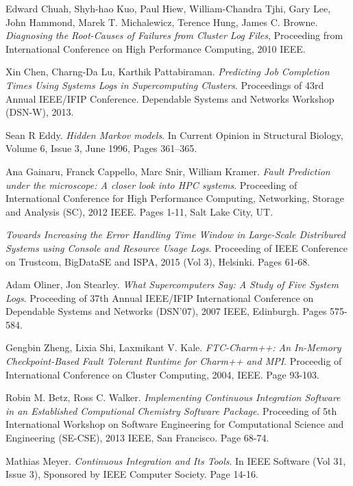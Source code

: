 \documentclass[10pt]{ruthesis}
\begin{document}
\begin{thebibliography}{30}
Edward Chuah, Shyh-hao Kuo, Paul Hiew, William-Chandra Tjhi, Gary Lee, John Hammond, Marek T. Michalewicz, Terence Hung, James C. Browne.
\textit{Diagnosing the Root-Causes of Failures from Cluster Log Files}, 
Proceeding from International Conference on High Performance Computing, 2010 IEEE.

Xin Chen, Charng-Da Lu, Karthik Pattabiraman.
\textit{Predicting Job Completion Times Using Systems Logs in Supercomputing Clusters}.
Proceedings of 43rd Annual IEEE/IFIP Conference.
Dependable Systems and Networks Workshop (DSN-W), 2013.

Sean R Eddy.
\textit{Hidden Markov models}.
In Current Opinion in Structural Biology, 
Volume 6, Issue 3, June 1996, Pages 361–365.

Ana Gainaru, Franck Cappello, Marc Snir, William Kramer.
\textit{Fault Prediction under the microscope: A closer look into HPC systems}.
Proceeding of International Conference for High Performance Computing, Networking, Storage and Analysis (SC), 2012 IEEE. Pages 1-11, Salt Lake City, UT.

\textit{Towards Increasing the Error Handling Time Window in Large-Scale Distribured Systems using Console and Resource Usage Logs}.
Proceeding of IEEE Conference on Trustcom, BigDataSE and ISPA, 2015 (Vol 3),
Helsinki. Pages 61-68.

Adam Oliner, Jon Stearley.
\textit{What Supercomputers Say: A Study of Five System Logs}.
Proceeding of 37th Annual IEEE/IFIP International Conference on Dependable Systems and Networks (DSN'07), 2007 IEEE, Edinburgh. Pages 575-584.

Gengbin Zheng, Lixia Shi, Laxmikant V. Kale.
\textit{FTC-Charm++: An In-Memory Checkpoint-Based Fault Tolerant Runtime for Charm++ and MPI}.
Proceedig of International Conference on Cluster Computing, 2004, IEEE. 
Page 93-103.

Robin M. Betz, Ross C. Walker.
\textit{Implementing Continuous Integration Software in an Established Computional Chemistry Software Package}.
Proceeding of 5th International Workshop on Software Engineering for Computational Science and Engineering (SE-CSE), 2013 IEEE, San Francisco. Page 68-74.

Mathias Meyer.
\textit{Continuous Integration and Its Tools}.
In IEEE Software (Vol 31, Issue 3), Sponsored by IEEE Computer Society.
Page 14-16.


\end{thebibliography}
\end{document}
